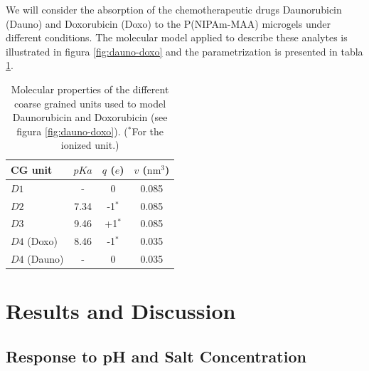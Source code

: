 We will consider the absorption of the chemotherapeutic drugs Daunorubicin (Dauno) and Doxorubicin (Doxo) to the P(NIPAm-MAA) microgels under different conditions.
The molecular model applied to describe these analytes is illustrated in figura  \ref{fig:dauno-doxo} and the parametrization is presented in tabla \ref{table:drugs}.\addcite[PerezChavez2020]


\begin{table}
\centering
\begin{tabular}{|lccc|}
    \hline
    {CG unit} & {$pKa$} & {$q$ ($e$)} & {$v$ ($\text{nm}^3$)} \\
      \hline
$D1$ & - & 0 & 0.085\\
$D2$ & 7.34 & -1$^\ast$ & 0.085\\
$D3$ & 9.46 & +1$^\ast$ & 0.085\\ 
$D4$ (Doxo) & 8.46 & -1$^\ast$ & 0.035\\
$D4$ (Dauno) & - & 0 & 0.035 \\
    \hline
  \end{tabular}
 \caption{Molecular properties of the different coarse grained units used to model Daunorubicin and Doxorubicin (see figura \ref{fig:dauno-doxo}).
\footnotesize ($^\ast$For the ionized unit.)}
\label{table:drugs} 
\end{table}




\section{Results and Discussion}



\subsection{Response to pH and Salt Concentration}\label{sec:pH_salt}


